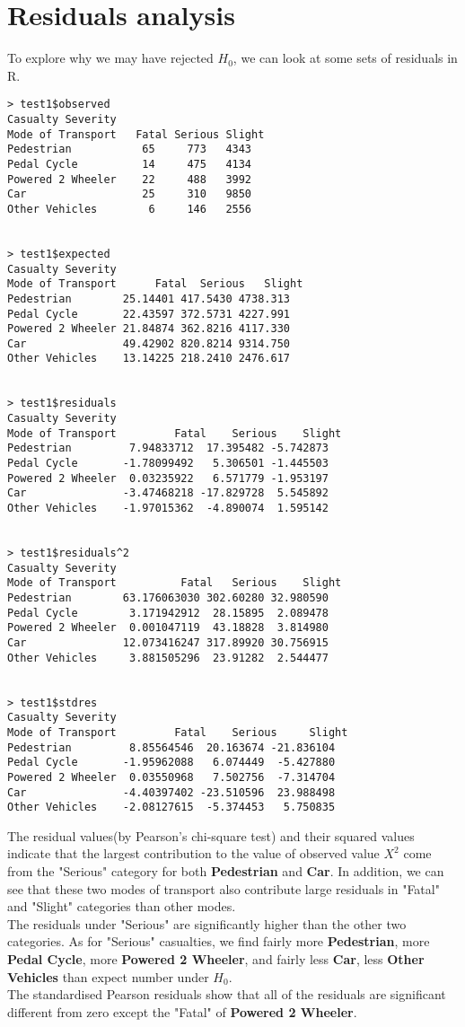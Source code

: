 \documentclass[12pt]{article}
\begin{document}
\section{Residuals analysis}  
To explore why we may have rejected $H_0$, we can look at some sets of residuals in R.
\begin{verbatim}
> test1$observed
Casualty Severity
Mode of Transport   Fatal Serious Slight
Pedestrian           65     773   4343
Pedal Cycle          14     475   4134
Powered 2 Wheeler    22     488   3992
Car                  25     310   9850
Other Vehicles        6     146   2556


> test1$expected
Casualty Severity
Mode of Transport      Fatal  Serious   Slight
Pedestrian        25.14401 417.5430 4738.313
Pedal Cycle       22.43597 372.5731 4227.991
Powered 2 Wheeler 21.84874 362.8216 4117.330
Car               49.42902 820.8214 9314.750
Other Vehicles    13.14225 218.2410 2476.617


> test1$residuals
Casualty Severity
Mode of Transport         Fatal    Serious    Slight
Pedestrian         7.94833712  17.395482 -5.742873
Pedal Cycle       -1.78099492   5.306501 -1.445503
Powered 2 Wheeler  0.03235922   6.571779 -1.953197
Car               -3.47468218 -17.829728  5.545892
Other Vehicles    -1.97015362  -4.890074  1.595142


> test1$residuals^2
Casualty Severity
Mode of Transport          Fatal   Serious    Slight
Pedestrian        63.176063030 302.60280 32.980590
Pedal Cycle        3.171942912  28.15895  2.089478
Powered 2 Wheeler  0.001047119  43.18828  3.814980
Car               12.073416247 317.89920 30.756915
Other Vehicles     3.881505296  23.91282  2.544477


> test1$stdres
Casualty Severity
Mode of Transport         Fatal    Serious     Slight
Pedestrian         8.85564546  20.163674 -21.836104
Pedal Cycle       -1.95962088   6.074449  -5.427880
Powered 2 Wheeler  0.03550968   7.502756  -7.314704
Car               -4.40397402 -23.510596  23.988498
Other Vehicles    -2.08127615  -5.374453   5.750835
\end{verbatim}
The residual values(by Pearson's chi-square test) and their squared values indicate that the largest contribution to the value of observed value $X^2$ come from the "Serious" category for both \textbf{Pedestrian} and \textbf{Car}. In addition, we can see that these two modes of transport also contribute large residuals in "Fatal" and "Slight" categories than other modes.\\ 
The residuals under "Serious" are significantly higher than the other two categories. As for "Serious" casualties, we find fairly more \textbf{Pedestrian}, more \textbf{Pedal Cycle}, more \textbf{Powered 2 Wheeler}, and fairly less \textbf{Car}, less \textbf{Other Vehicles} than expect number under $H_0$.\\
The standardised Pearson residuals show that all of the residuals are significant different from zero except the "Fatal" of \textbf{Powered 2 Wheeler}. 
\end{document}
